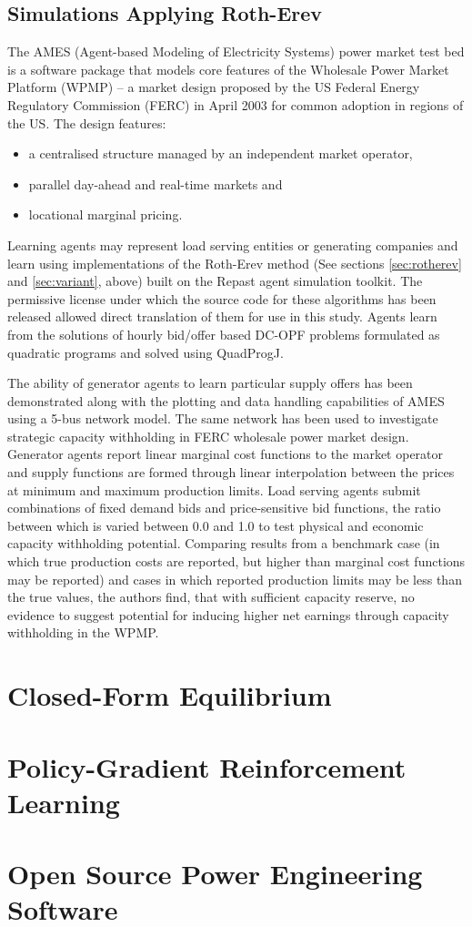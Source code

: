 \subsection{Simulations Applying Roth-Erev}
The AMES (Agent-based Modeling of Electricity Systems) power market test bed is
a software package that models core features of the Wholesale Power Market
Platform (WPMP) -- a market design proposed by the US Federal Energy Regulatory
Commission (FERC) in April 2003 for common adoption in regions of the
US\cite{tesfatsi:wpmp}. The design features:
\begin{itemize}
  \item a centralised structure managed by an independent market operator,
  \item parallel day-ahead and real-time markets and
  \item locational marginal pricing.
\end{itemize}
Learning agents may represent load serving entities or generating companies and
learn using implementations of the Roth-Erev method (See sections
\ref{sec:rotherev} and \ref{sec:variant}, above) built on the Repast agent
simulation toolkit\cite{gieseler:thesis}.  The permissive license under which
the source code for these algorithms has been released allowed direct
translation of them for use in this study.  Agents learn from the solutions of
hourly bid/offer based DC-OPF problems formulated as quadratic programs and
solved using QuadProgJ\cite{tesfatsi:dcopf}.

The ability of generator agents to learn particular supply offers has been
demonstrated along with the plotting and data handling capabilities of AMES
using a 5-bus network model\cite{tesfatsi:pes09}.  The same network has been
used to investigate strategic capacity withholding in FERC wholesale power
market design\cite{tesfasi:psce}.  Generator agents report linear marginal cost
functions to the market operator and supply functions are formed through linear
interpolation between the prices at minimum and maximum production limits.
Load serving agents submit combinations of fixed demand bids and
price-sensitive bid functions, the ratio between which is varied between 0.0 and
1.0 to test physical and economic capacity withholding potential.  Comparing
results from a benchmark case (in which true production costs are reported,
but higher than marginal cost functions may be reported) and cases in which
reported production limits may be less than the true values, the authors find,
that with sufficient capacity reserve, no evidence to suggest potential for
inducing higher net earnings through capacity withholding in the WPMP.

\section{Closed-Form Equilibrium}

\section{Policy-Gradient Reinforcement Learning}

\section{Open Source Power Engineering Software}

